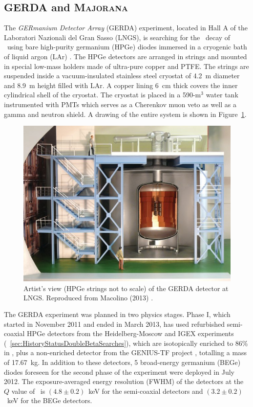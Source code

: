\documentclass{PoS}
\begin{document}
\subsection{GERDA and {\scshape Majorana}} \label{subsec:GERDA}
The \emph{GERmanium Detector Array} (GERDA) experiment, located in Hall A of the Laboratori Nazionali del Gran Sasso (LNGS), is searching for the \bbonu\ decay of \GE\ using bare high-purity germanium (HPGe) diodes immersed in a cryogenic bath of liquid argon (LAr) \cite{Ackermann:2012xja}. The HPGe detectors are arranged in strings and mounted in special low-mass holders made of ultra-pure copper and PTFE. The strings are suspended inside a vacuum-insulated stainless steel cryostat of 4.2~m diameter and 8.9~m height filled with LAr. A copper lining 6~cm thick covers the inner cylindrical shell of the cryostat. The cryostat is placed in a 590-m$^{3}$ water tank instrumented with PMTs which serves as a Cherenkov muon veto as well as a gamma and neutron shield. A drawing of the entire system is shown in Figure~\ref{fig:GERDA}.

\begin{figure}
\centering
\includegraphics[width=.75\textwidth]{img/GERDA.jpg}
\caption{Artist's view (HPGe strings not to scale) of the GERDA detector at LNGS. Reproduced from Macolino (2013) \cite{Macolino:2013hca}.} \label{fig:GERDA}
\end{figure}

The GERDA experiment was planned in two physics stages.
Phase I, which started in November 2011 and ended in March 2013, has used refurbished semi-coaxial HPGe detectors from the Heidelberg-Moscow and IGEX experiments (\textsection~\ref{sec:HistoryStatusDoubleBetaSearches}), which are isotopically enriched to 86\% in \GE, plus a non-enriched detector from the GENIUS-TF project \cite{KlapdorKleingrothaus:2000ke}, totalling a mass of 17.67~kg. In addition to these detectors, 5 broad-energy germanium (BEGe) diodes foreseen for the second phase of the experiment were deployed in July 2012. The exposure-averaged energy resolution (FWHM) of the detectors at the $Q$ value of \GE\ is $(4.8\pm0.2)$~keV for the semi-coaxial detectors and $(3.2\pm0.2)$~keV for the BEGe detectors.
\end{document}
